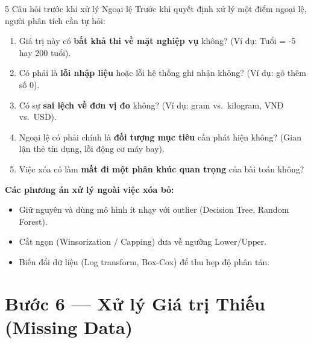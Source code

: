 \documentclass[aspectratio=169,11pt]{beamer}
\newcommand{\smallgap}{\vspace{0.35em}}
\begin{document}
\begin{frame}{5 Câu hỏi trước khi xử lý Ngoại lệ}
Trước khi quyết định xử lý một điểm ngoại lệ, người phân tích cần tự hỏi:
\begin{enumerate}
  \item Giá trị này có \textbf{bất khả thi về mặt nghiệp vụ} không? (Ví dụ: Tuổi = -5 hay 200 tuổi).
  \item Có phải là \textbf{lỗi nhập liệu} hoặc lỗi hệ thống ghi nhận không? (Ví dụ: gõ thêm số 0).
  \item Có sự \textbf{sai lệch về đơn vị đo} không? (Ví dụ: gram vs.\ kilogram, VNĐ vs.\ USD).
  \item Ngoại lệ có phải chính là \textbf{đối tượng mục tiêu} cần phát hiện không? (Gian lận thẻ tín dụng, lỗi động cơ máy bay).
  \item Việc xóa có làm \textbf{mất đi một phân khúc quan trọng} của bài toán không?
\end{enumerate}

\smallgap
\textbf{Các phương án xử lý ngoài việc xóa bỏ:}
\begin{itemize}
  \item Giữ nguyên và dùng mô hình ít nhạy với outlier (Decision Tree, Random Forest).
  \item Cắt ngọn (Winsorization / Capping) đưa về ngưỡng $\text{Lower} / \text{Upper}$.
  \item Biến đổi dữ liệu (Log transform, Box-Cox) để thu hẹp độ phân tán.
\end{itemize}
\end{frame}

\section{Bước 6 — Xử lý Giá trị Thiếu (Missing Data)}
\end{document}
